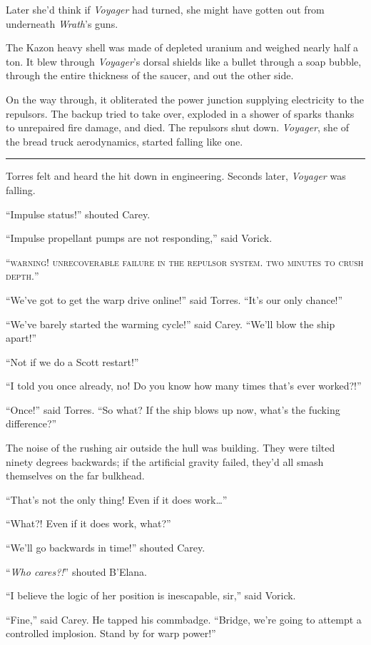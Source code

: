 \documentclass[twoside,letterpaper,12pt]{memoir}
\begin{document}
Later she'd think if \textit{Voyager} had turned, she might have gotten out from underneath \textit{Wrath}'s guns.

The Kazon heavy shell was made of depleted uranium and weighed nearly half a ton. It blew through \textit{Voyager}'s dorsal shields like a bullet through a soap bubble, through the entire thickness of the saucer, and out the other side.

On the way through, it obliterated the power junction supplying electricity to the repulsors. The backup tried to take over, exploded in a shower of sparks thanks to unrepaired fire damage, and died. The repulsors shut down. \textit{Voyager}, she of the bread truck aerodynamics, started falling like one.

\fancybreak{\rule{3cm}{0.4 pt}}
Torres felt and heard the hit down in engineering. Seconds later, \textit{Voyager} was falling.

``Impulse status!'' shouted Carey.

``Impulse propellant pumps are not responding,'' said Vorick.

``\textsc{warning! unrecoverable failure in the repulsor system. two minutes to crush depth.}''

``We've got to get the warp drive online!'' said Torres. ``It's our only chance!''

``We've barely started the warming cycle!'' said Carey. ``We'll blow the ship apart!''

``Not if we do a Scott restart!''

``I told you once already, no! Do you know how many times that's ever worked?!''

``Once!'' said Torres. ``So what? If the ship blows up now, what's the fucking difference?''

The noise of the rushing air outside the hull was building. They were tilted ninety degrees backwards; if the artificial gravity failed, they'd all smash themselves on the far bulkhead.

``That's not the only thing! Even if it does work\ldots''

``What?! Even if it does work, what?''

``We'll go backwards in time!'' shouted Carey.

``\textit{Who cares?!}'' shouted B'Elana.

``I believe the logic of her position is inescapable, sir,'' said Vorick.

``Fine,'' said Carey. He tapped his commbadge. ``Bridge, we're going to attempt a controlled implosion. Stand by for warp power!''
\end{document}
